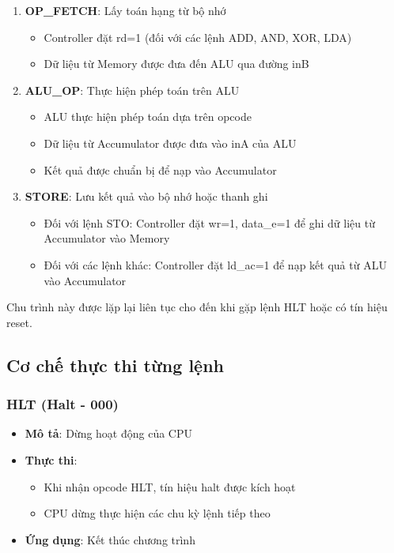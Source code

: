 \begin{enumerate}
    \item \textbf{OP\_FETCH}: Lấy toán hạng từ bộ nhớ
    \begin{itemize}
        \item Controller đặt rd=1 (đối với các lệnh ADD, AND, XOR, LDA)
        \item Dữ liệu từ Memory được đưa đến ALU qua đường inB
    \end{itemize}

    \item \textbf{ALU\_OP}: Thực hiện phép toán trên ALU
    \begin{itemize}
        \item ALU thực hiện phép toán dựa trên opcode
        \item Dữ liệu từ Accumulator được đưa vào inA của ALU
        \item Kết quả được chuẩn bị để nạp vào Accumulator
    \end{itemize}

    \item \textbf{STORE}: Lưu kết quả vào bộ nhớ hoặc thanh ghi
    \begin{itemize}
        \item Đối với lệnh STO: Controller đặt wr=1, data\_e=1 để ghi dữ liệu từ Accumulator vào Memory
        \item Đối với các lệnh khác: Controller đặt ld\_ac=1 để nạp kết quả từ ALU vào Accumulator
    \end{itemize}
\end{enumerate}

Chu trình này được lặp lại liên tục cho đến khi gặp lệnh HLT hoặc có tín hiệu reset.

\subsection{Cơ chế thực thi từng lệnh}

\subsubsection{HLT (Halt - 000)}
\begin{itemize}
    \item \textbf{Mô tả}: Dừng hoạt động của CPU
    \item \textbf{Thực thi}: 
    \begin{itemize}
        \item Khi nhận opcode HLT, tín hiệu halt được kích hoạt
        \item CPU dừng thực hiện các chu kỳ lệnh tiếp theo
    \end{itemize}
    \item \textbf{Ứng dụng}: Kết thúc chương trình
\end{itemize}

